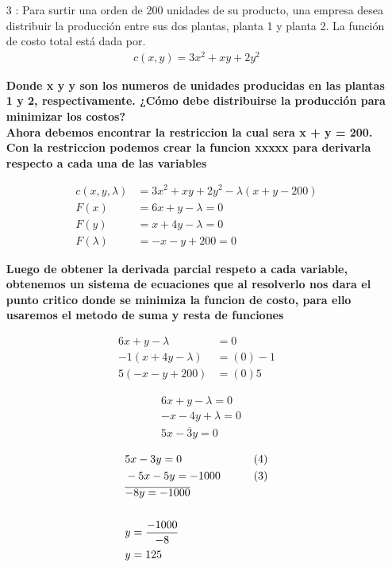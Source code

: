 \documentclass[13pt]{memoir}
\begin{document}
\begin{enumerate}
\item[ 3]: Para surtir una orden de 200 unidades de su producto, una empresa desea distribuir la producción entre sus dos plantas, planta 1 y planta 2. La función de costo total está dada por.\\
\begin{align*}
    c(x, y) = 3x^2 +xy + 2y^2
\end{align*}

\textbf{Donde x y y son los numeros de unidades producidas en las plantas 1 y 2, respectivamente. ¿Cómo debe distribuirse la producción para minimizar los costos? }\\

\textbf{Ahora debemos encontrar la restriccion la cual sera x + y = 200. Con la restriccion podemos crear la funcion xxxxx para derivarla respecto a cada una de las variables}


\begin{align*}
c(x, y, \lambda) &= 3x^2 + xy + 2y^2 - \lambda(x + y - 200)\\
F(x) &= 6x + y - \lambda = 0\\
F(y) &= x + 4y - \lambda = 0\\
F(\lambda) &= -x - y + 200 = 0
\end{align*}

\textbf{Luego de obtener la derivada parcial respeto a cada variable, obtenemos un sistema de ecuaciones que al resolverlo nos dara el punto critico donde se minimiza la funcion de costo, para ello usaremos el metodo de suma y resta de funciones
}


\begin{align}
6x + y - \lambda &= 0 \label{eq:first}\\
-1(x + 4y - \lambda) &= (0) - 1 \label{eq:second}\\
5(-x - y + 200) &= (0) 5 \label{eq:third}
\end{align}

\setcounter{equation}{0} %

\begin{align}
&6x + y - \lambda = 0 \label{eq:first} \\
&-x - 4y + \lambda = 0 \label{eq:second} \\
&\overline{5x - 3y = 0} \tag{4} \label{eq:fourth}
\end{align}

\setcounter{equation}{0} %


\begin{align}
&5x - 3y = 0 & \tag{4} \label{eq:fourth} \\
&-5x - 5y = -1000 & \tag{3} \label{eq:third} \\ 
&\overline{-8y = -1000}  \notag \\ \notag \\
&y = \frac{-1000}{-8} & \notag \\
&y = 125 & \notag \\  \notag
\end{align}





\end{enumerate}
\end{document}
